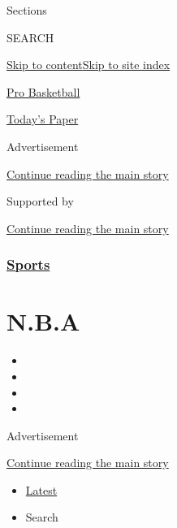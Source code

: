 Sections

SEARCH

\protect\hyperlink{site-content}{Skip to
content}\protect\hyperlink{site-index}{Skip to site index}

\href{https://www.nytimes.com/section/sports/basketball}{Pro Basketball}

\href{https://myaccount.nytimes.com/auth/login?response_type=cookie\&client_id=vi}{}

\href{https://www.nytimes.com/section/todayspaper}{Today's Paper}

Advertisement

\protect\hyperlink{after-top}{Continue reading the main story}

Supported by

\protect\hyperlink{after-sponsor}{Continue reading the main story}

\hypertarget{sports}{%
\subsubsection{\texorpdfstring{\href{/section/sports}{Sports}}{Sports}}\label{sports}}

\hypertarget{nba}{%
\section{N.B.A}\label{nba}}

\begin{itemize}
\item
\item
\item
\item
\end{itemize}

Advertisement

\protect\hyperlink{after-subheader}{Continue reading the main story}

\begin{itemize}
\tightlist
\item
  \protect\hyperlink{stream-panel}{Latest}
\item
  Search
\end{itemize}

